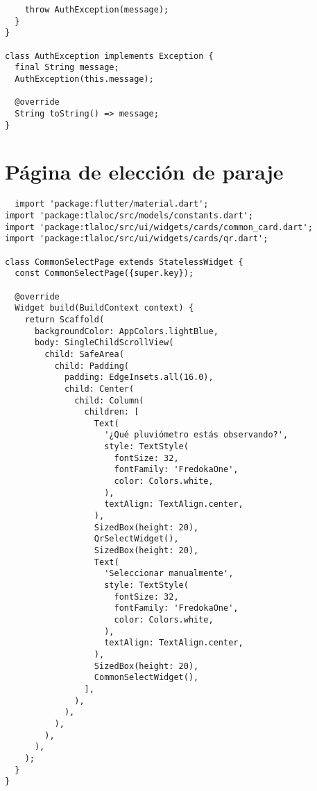 \begin{verbatim}
    throw AuthException(message);
  }
}

class AuthException implements Exception {
  final String message;
  AuthException(this.message);
  
  @override
  String toString() => message;
}
\end{verbatim}










\section{Página de elección de paraje}
\label{anexo:alg10}

\begin{verbatim}
  import 'package:flutter/material.dart';
import 'package:tlaloc/src/models/constants.dart';
import 'package:tlaloc/src/ui/widgets/cards/common_card.dart';
import 'package:tlaloc/src/ui/widgets/cards/qr.dart';

class CommonSelectPage extends StatelessWidget {
  const CommonSelectPage({super.key});

  @override
  Widget build(BuildContext context) {
    return Scaffold(
      backgroundColor: AppColors.lightBlue,
      body: SingleChildScrollView(
        child: SafeArea(
          child: Padding(
            padding: EdgeInsets.all(16.0),
            child: Center(
              child: Column(
                children: [
                  Text(
                    '¿Qué pluviómetro estás observando?',
                    style: TextStyle(
                      fontSize: 32,
                      fontFamily: 'FredokaOne',
                      color: Colors.white,
                    ),
                    textAlign: TextAlign.center,
                  ),
                  SizedBox(height: 20),
                  QrSelectWidget(),
                  SizedBox(height: 20),
                  Text(
                    'Seleccionar manualmente',
                    style: TextStyle(
                      fontSize: 32,
                      fontFamily: 'FredokaOne',
                      color: Colors.white,
                    ),
                    textAlign: TextAlign.center,
                  ),
                  SizedBox(height: 20),
                  CommonSelectWidget(),
                ],
              ),
            ),
          ),
        ),
      ),
    );
  }
}

\end{verbatim}







